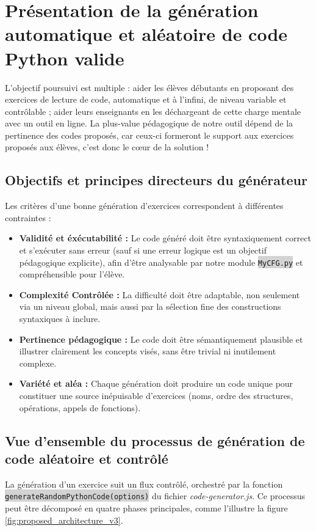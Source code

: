 \documentclass[11pt,a4paper]{article}
\newcommand{\code}[1]{\colorbox{lightgray}{\texttt{\small #1}}}
\newcommand{\filepath}[1]{\textit{#1}}
\begin{document}
\clearpage
\section{Présentation de la génération automatique et aléatoire de code Python valide}
L'objectif poursuivi est multiple : aider les élèves débutants en proposant des exercices de lecture de code, automatique et à l'infini, de niveau variable et contrôlable ; aider leurs enseignants en les déchargeant de cette charge mentale avec un outil en ligne. La plus-value pédagogique de notre outil dépend de la pertinence des codes proposés, car ceux-ci formeront le support aux exercices proposés aux élèves, c'est donc le cœur de la solution !

\subsection{Objectifs et principes directeurs du générateur}
Les critères d'une bonne génération d'exercices correspondent à différentes contraintes : \begin{itemize}
    \item \textbf{Validité et éxécutabilité :} Le code généré doit être syntaxiquement correct et s'exécuter sans erreur (sauf si une erreur logique est un objectif pédagogique explicite), afin d'être analysable par notre module \code{MyCFG.py} et compréhensible pour l'élève.
    \item \textbf{Complexité Contrôlée :} La difficulté doit être adaptable, non seulement via un niveau global, mais aussi par la sélection fine des constructions syntaxiques à inclure.
    \item \textbf{Pertinence pédagogique :} Le code doit être sémantiquement plausible et illustrer clairement les concepts visés, sans être trivial ni inutilement complexe.
    \item \textbf{Variété et aléa :} Chaque génération doit produire un code unique pour constituer une source inépuisable d'exercices  (noms, ordre des structures, opérations, appels de fonctions).
\end{itemize}

\subsection{Vue d'ensemble du processus de génération de code aléatoire et contrôlé}
La génération d'un exercice suit un flux contrôlé, orchestré par la fonction \code{generateRandomPythonCode(options)} du fichier \filepath{code-generator.js}. Ce processus peut être décomposé en quatre phases principales, comme l'illustre la figure \ref{fig:proposed_architecture_v3}.
\end{document}
